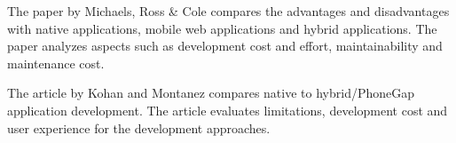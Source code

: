 The paper by Michaels, Ross \& Cole compares the advantages and disadvantages with native applications, mobile web applications and hybrid applications. The paper analyzes aspects such as development cost and effort, maintainability and maintenance cost. 

The article by Kohan and Montanez compares native to hybrid/PhoneGap application development.  The article evaluates  limitations, development cost and user experience for the development approaches.